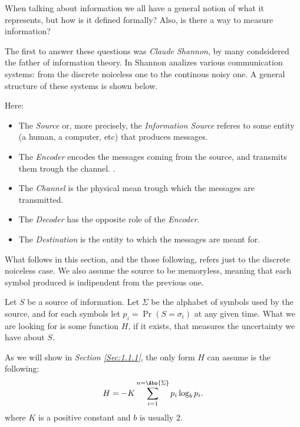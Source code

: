 \documentclass{subfiles}
\begin{document}
    When talking about information we all have a general notion of what it represents,
        but how is it defined formally? 
        Also, is there a way to measure information?

    The first to answer these questions was \emph{Claude Shannon}, 
        by many condsidered the father of information theory.
    In \cite{Shannon} Shannon analizes various communication systems:
        from the discrete noiceless one to the continous noisy one.
        A general structure of these systems is shown below.
        

    Here:
    \begin{itemize}
        \item The \emph{Source} or, more precisely, 
            the \emph{Information Source} referes to some entity
            (a human, a computer, etc) that produces messages.

        \item The \emph{Encoder} encodes the messages coming from the source,
            and transmits them trough the channel.
.
        \item The \emph{Channel} is the physical mean trough which the messages
            are transmitted.

        \item The \emph{Decoder} has the opposite role of the \emph{Encoder}.
        \item The \emph{Destination} is the entity to which the messages are meant for.
    \end{itemize}

    \begin{remark*}
        What follows in this section, and the those following,
        refers just to the discrete noiceless case. 
        We also assume the source to be memoryless, 
        meaning that each symbol produced is indipendent from the previous one.
    \end{remark*}

    Let \(S\) be a source of information. 
    Let \(\Sigma\) be the alphabet of symbols used by the source,
    and for each symbols let \(p_{i} = \Pr(S = \sigma_{i})\) at any given time.
    What we are looking for is some function \(H\), if it exists,
    that measures the uncertainty we have about \(S\).

    As we will show in \emph{Section \ref{Sec:1.1.1}}, 
        the only form \(H\) can assume is the following:
    \begin{equation}\label{Eq:1}
        H = -K \sum_{i = 1}^{n = \Abs{\Sigma}}{p_{i} \log_{b} p_{i}}.
    \end{equation}
    where \(K\) is a positive constant and \(b \text{ is usually } 2\).
 
\end{document}
